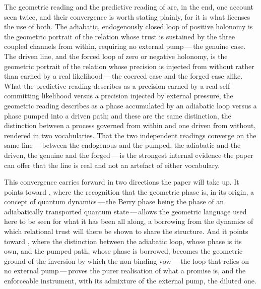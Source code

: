 The geometric reading and the predictive reading of  are, in the end, one account seen twice, and their convergence is worth stating plainly, for it is what licenses the use of both. The adiabatic, endogenously closed loop of positive holonomy is the geometric portrait of the relation whose trust is sustained by the three coupled channels from within, requiring no external pump\,---\,the genuine case. The driven line, and the forced loop of zero or negative holonomy, is the geometric portrait of the relation whose precision is injected from without rather than earned by a real likelihood\,---\,the coerced case and the forged case alike. What the predictive reading describes as a precision earned by a real self-committing likelihood versus a precision injected by external pressure, the geometric reading describes as a phase accumulated by an adiabatic loop versus a phase pumped into a driven path; and these are the same distinction, the distinction between a process governed from within and one driven from without, rendered in two vocabularies. That the two independent readings converge on the same line\,---\,between the endogenous and the pumped, the adiabatic and the driven, the genuine and the forged\,---\,is the strongest internal evidence the paper can offer that the line is real and not an artefact of either vocabulary.

This convergence carries forward in two directions the paper will take up. It points toward , where the recognition that the geometric phase is, in its origin, a concept of quantum dynamics\,---\,the Berry phase being the phase of an adiabatically transported quantum state\,---\,allows the geometric language used here to be seen for what it has been all along, a borrowing from the dynamics of which relational trust will there be shown to share the structure. And it points toward , where the distinction between the adiabatic loop, whose phase is its own, and the pumped path, whose phase is borrowed, becomes the geometric ground of the inversion by which the non-binding vow\,---\,the loop that relies on no external pump\,---\,proves the purer realisation of what a promise is, and the enforceable instrument, with its admixture of the external pump, the diluted one.
